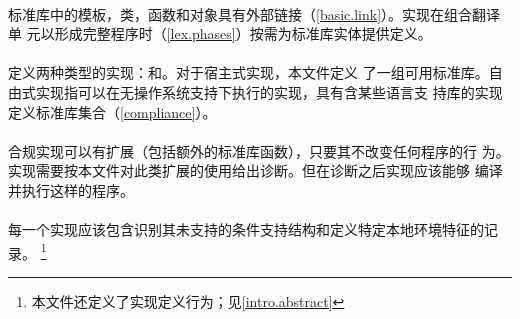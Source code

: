 \paragraph{} %
标准库中的模板，类，函数和对象具有外部链接（\ref{basic.link}）。实现在组合翻译单
元以形成完整\cpp{}程序时（\ref{lex.phases}）按需为标准库实体提供定义。

\paragraph{} %
定义两种类型的实现：和。对于宿主式实现，本文件定义
了一组可用标准库。自由式实现指可以在无操作系统支持下执行的实现，具有含某些语言支
持库的实现定义标准库集合（\ref{compliance}）。

\paragraph{} %
合规实现可以有扩展（包括额外的标准库函数），只要其不改变任何\wellform{}程序的行
为。实现需要按本文件对此类扩展的\illform{}使用给出诊断。但在诊断之后实现应该能够
编译并执行这样的程序。

\paragraph{} %
每一个实现应该包含识别其未支持的条件支持结构和定义特定本地环境特征的记录。
\footnote{本文件还定义了实现定义行为；见\ref{intro.abstract}}

